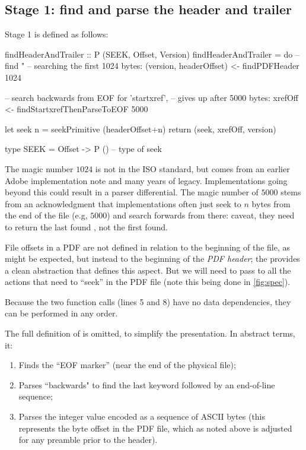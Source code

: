 \subsection{Stage 1: find and parse the header and trailer}
\label{sec:stage-1}

Stage 1 is defined as follows:
\begin{code}
findHeaderAndTrailer :: P (SEEK, Offset, Version)
findHeaderAndTrailer =
    do
    -- find "%
    -- searching the first 1024 bytes:
    (version, headerOffset) <- findPDFHeader 1024

    -- search backwards from EOF for 'startxref',
    -- gives up after 5000 bytes:
    xrefOff <- findStartxrefThenParseToEOF 5000
    
    let seek n = seekPrimitive (headerOffset+n)
    return (seek, xrefOff, version)
    
type SEEK = Offset -> P () -- type of seek
\end{code}

The magic number $1024$ is not in the ISO standard, but comes from an earlier Adobe implementation note and many years of legacy.  Implementations going beyond this could result in a parser differential.
The magic number of $5000$ stems from an acknowledgment that implementations often just seek to 
$n$ bytes from the end of the file (e.g, $5000$) and search forwards from there: caveat, they need to return the last found , not the first found.

File offsets in a PDF are not defined in relation to the beginning of
the file, as might be expected, but instead to the beginning of the
\emph{PDF header};
%
the  provides a clean abstraction that defines this
aspect.
%
But we will need to pass  to all the actions that need to
``seek'' in the PDF file (note this being done in \cref{fig:spec}).

Because the two function calls (lines 5 and 8) have no data
dependencies, they can be performed in any order.
%

The full definition of  is
omitted, to simplify the presentation.
%
In abstract terms, it:
\begin{enumerate}
\item Finds the ``EOF marker''  (near the end of the physical
  file);
\item Parses ``backwards" to find the last  keyword
  followed by an end-of-line sequence;
\item Parses the integer value encoded as a sequence of ASCII bytes
  (this represents the byte offset in the PDF file, which as noted
  above is adjusted for any preamble prior to the header).
\end{enumerate}

